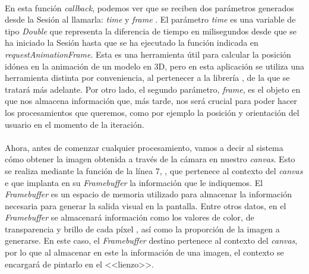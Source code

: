 \documentclass{subfiles}
\begin{document}
        \paragraph{}
        En esta función \textit{callback}, podemos ver que se reciben dos parámetros generados desde la Sesión al llamarla: \textit{time} y \textit{frame} \cite{web:requestanimationframe}. El parámetro \textit{time} es una variable de tipo \textit{Double} que representa la diferencia de tiempo en milisegundos desde que se ha iniciado la Sesión hasta que se ha ejecutado la función indicada en \textit{requestAnimationFrame}. Esta es una herramienta útil para calcular la posición idónea en la animación de un modelo en 3D, pero en esta aplicación se utiliza una herramienta distinta por conveniencia, al pertenecer a la librería \threejs, de la que se tratará más adelante. Por otro lado, el segundo parámetro, \textit{frame}, es el objeto en que \webxr nos almacena información que, más tarde, nos será crucial para poder hacer los procesamientos que queremos, como por ejemplo la posición y orientación del usuario en el momento de la iteración.

        \paragraph{}
        Ahora, antes de comenzar cualquier procesamiento, vamos a decir al sistema cómo obtener la imagen obtenida a través de la cámara en nuestro \textit{canvas}. Esto se realiza mediante la función de la línea 7, \cite{web:mozilla_bindframebuffer}, que pertenece al contexto del \textit{canvas} e que implanta en su \textit{Framebuffer} la información que le indiquemos. El \textit{Framebuffer} es un espacio de memoria utilizado para almacenar la información necesaria para generar la salida visual en la pantalla. Entre otros datos, en el \textit{Framebuffer} se almacenará información como los valores de color, de transparencia y brillo de cada píxel \cite{web:wiki_framebuffer}, así como la proporción de la imagen a generarse. En este caso, el \textit{Framebuffer} destino pertenece al contexto del \textit{canvas}, por lo que al almacenar en este la información de una imagen, el contexto se encargará de pintarlo en el <<lienzo>>.
\end{document}
